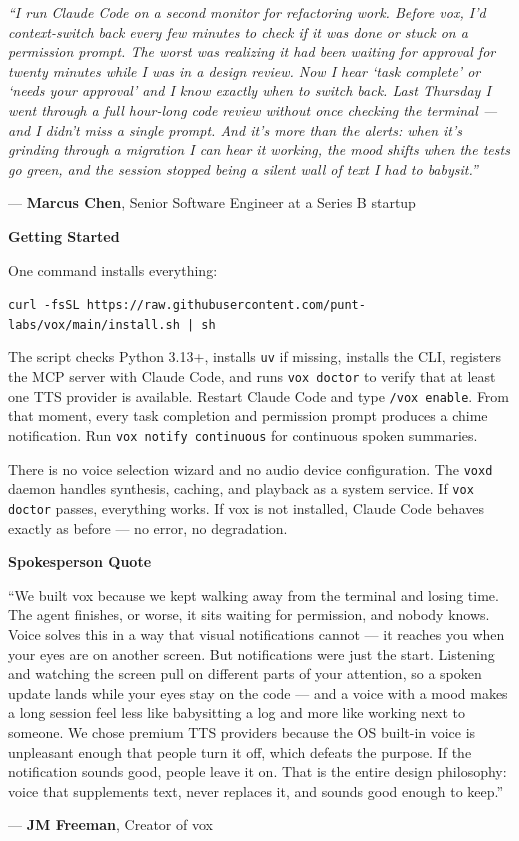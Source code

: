 \documentclass[11pt,letterpaper]{article}
\newcommand{\prsection}[1]{%
  \vspace{1em}%
  {\large\bfseries\color{SectionBlue}#1}%
  \vspace{0.3em}\par%
}
\begin{document}
\begin{customerquote}
\textit{``I run Claude Code on a second monitor for refactoring work. Before
vox, I'd context-switch back every few minutes to check if it was done or
stuck on a permission prompt. The worst was realizing it had been waiting for
approval for twenty minutes while I was in a design review. Now I hear `task
complete' or `needs your approval' and I know exactly when to switch back.
Last Thursday I went through a full hour-long code review without once checking
the terminal --- and I didn't miss a single prompt. And it's more than the
alerts: when it's grinding through a migration I can hear it working, the mood
shifts when the tests go green, and the session stopped being a silent wall of
text I had to babysit.''}

\raggedleft --- \textbf{Marcus Chen}, Senior Software Engineer at a Series B
startup
\end{customerquote}

\prsection{Getting Started}

One command installs everything:

{\small\texttt{curl -fsSL https://raw.githubusercontent.com/punt-labs/vox/main/install.sh | sh}}

The script checks Python 3.13+, installs \texttt{uv} if missing, installs
the CLI, registers the MCP server with Claude Code, and runs
\texttt{vox doctor} to verify that at least one TTS provider is available.
Restart Claude Code and type \texttt{/vox enable}. From that moment, every
task completion and permission prompt produces a chime notification.
Run \texttt{vox notify continuous} for continuous spoken summaries.

There is no voice selection wizard and no audio device configuration. The
\texttt{voxd} daemon handles synthesis, caching, and playback as a system
service. If \texttt{vox doctor} passes, everything works. If vox is not
installed, Claude Code behaves exactly as before --- no error, no
degradation.

\prsection{Spokesperson Quote}

\begin{spokespersonquote}
``We built vox because we kept walking away from the terminal and losing
time. The agent finishes, or worse, it sits waiting for permission, and nobody
knows. Voice solves this in a way that visual notifications cannot ---
it reaches you when your eyes are on another screen. But notifications were
just the start. Listening and watching the screen pull on different parts of
your attention, so a spoken update lands while your eyes stay on the code --- and a
voice with a mood makes a long session feel less like babysitting a log and
more like working next to someone. We chose premium TTS
providers because the OS built-in voice is unpleasant enough that people turn
it off, which defeats the purpose. If the notification sounds good, people
leave it on. That is the entire design philosophy: voice that supplements text,
never replaces it, and sounds good enough to keep.''

\raggedleft --- \textbf{JM Freeman}, Creator of vox
\end{spokespersonquote}
\end{document}
